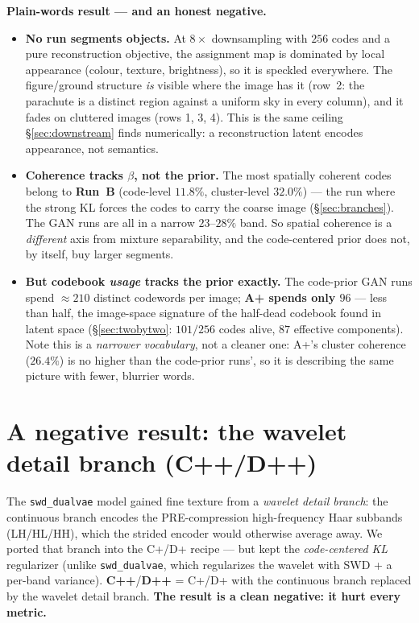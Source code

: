 \documentclass[11pt]{article}
\begin{document}
\textbf{Plain-words result --- and an honest negative.}
\begin{itemize}
  \item \textbf{No run segments objects.} At $8\times$ downsampling with $256$ codes and a pure
  reconstruction objective, the assignment map is dominated by local appearance (colour, texture,
  brightness), so it is speckled everywhere. The figure/ground structure \emph{is} visible where
  the image has it (row~2: the parachute is a distinct region against a uniform sky in every
  column), and it fades on cluttered images (rows 1, 3, 4). This is the same ceiling
  \S\ref{sec:downstream} finds numerically: a reconstruction latent encodes appearance, not
  semantics.
  \item \textbf{Coherence tracks $\beta$, not the prior.} The most spatially coherent codes belong
  to \textbf{Run~B} (code-level $11.8\%$, cluster-level $32.0\%$) --- the run where the strong KL
  forces the codes to carry the coarse image (\S\ref{sec:branches}). The GAN runs are all in a
  narrow $23$--$28\%$ band. So spatial coherence is a \emph{different} axis from mixture
  separability, and the code-centered prior does not, by itself, buy larger segments.
  \item \textbf{But codebook \emph{usage} tracks the prior exactly.} The code-prior GAN runs spend
  $\approx$$210$ distinct codewords per image; \textbf{A+ spends only $96$} --- less than half, the
  image-space signature of the half-dead codebook found in latent space
  (\S\ref{sec:twobytwo}: $101/256$ codes alive, $87$ effective components). Note this is a
  \emph{narrower vocabulary}, not a cleaner one: A+'s cluster coherence ($26.4\%$) is no higher
  than the code-prior runs', so it is describing the same picture with fewer, blurrier words.
\end{itemize}

\section{A negative result: the wavelet detail branch (C++/D++)}
\label{sec:wavelet}
The \texttt{swd\_dualvae} model gained fine texture from a \emph{wavelet detail branch}: the
continuous branch encodes the PRE-compression high-frequency Haar subbands (LH/HL/HH), which the
strided encoder would otherwise average away. We ported that branch into the C+/D+ recipe ---
but kept the \emph{code-centered KL} regularizer (unlike \texttt{swd\_dualvae}, which regularizes
the wavelet with SWD + a per-band variance). \textbf{C++}/\textbf{D++} = C+/D+ with the continuous
branch replaced by the wavelet detail branch. \textbf{The result is a clean negative: it hurt
every metric.}
\end{document}
